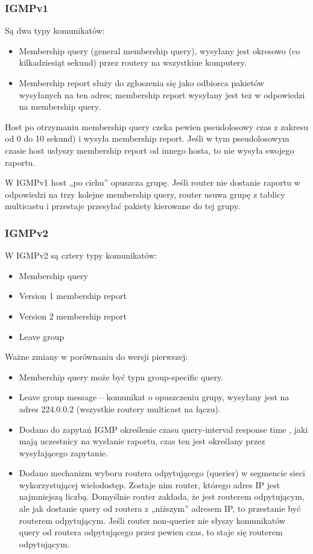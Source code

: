 \documentclass[../main.tex]{subfiles}
\begin{document}
    \subsubsection{IGMPv1}

    Są dwa typy komunikatów:
    \begin{itemize}
        \item Membership query (general membership query), wysyłany jest okresowo (co
        kilkadziesiąt sekund) przez routery na wszystkiue komputery.
        \item Membership report służy do zgłoszenia się jako odbiorca pakietów wysyłanych na ten adres; membership
        report wysyłany jest też w odpowiedzi na membership query.
    \end{itemize}


    Host po otrzymaniu membership query czeka pewien pseudolosowy czas z
    zakresu od 0 do 10 sekund) i wysyła membership report. Jeśli w tym pseudolosowym czasie
    host usłyszy membership report od innego hosta, to nie wysyła swojego raportu.

    W IGMPv1 host „po cichu” opuszcza grupę. Jeśli router nie dostanie raportu w odpowiedzi
    na trzy kolejne membership query,
    router usuwa grupę z tablicy multicastu i przestaje przesyłać pakiety kierowane do tej grupy.

    \subsubsection{IGMPv2}

    W IGMPv2 są cztery typy komunikatów:
    \begin{itemize}
        \item Membership query
        \item Version 1 membership report
        \item Version 2 membership report
        \item Leave group
    \end{itemize}


    Ważne zmiany w porównaniu do wersji pierwszej:
    \begin{itemize}
        \item Membership query może być typu group-specific query.
        \item Leave group message – komunikat o opuszczeniu grupy, wysyłany jest na adres
        224.0.0.2 (wszystkie routery multicast na łączu).
        \item Dodano do zapytań IGMP określenie czasu query-interval response time , jaki mają uczestnicy na wysłanie raportu, czas ten jest określany przez
        wysyłającego zapytanie.
        \item Dodano mechanizm wyboru routera odpytującego (querier) w segmencie sieci
        wykorzystującej wielodostęp. Zostaje nim router, którego adres IP jest najmniejszą
        liczbą. Domyślnie router zakłada, że jest routerem
        odpytującym, ale jak dostanie query od routera z „niższym” adresem IP, to przestanie być routerem odpytującym. Jeśli
        router non-querier nie słyszy komunikatów query od routera odpytującego przez
        pewien czas, to staje się routerem odpytującym.
    \end{itemize}
\end{document}
